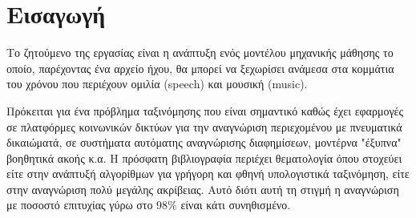 \section{Εισαγωγή}

Το ζητούμενο της εργασίας είναι η ανάπτυξη ενός μοντέλου μηχανικής
μάθησης το οποίο, παρέχοντας ένα αρχείο ήχου, θα μπορεί να ξεχωρίσει
ανάμεσα στα κομμάτια του χρόνου που περιέχουν ομιλία (speech) και
μουσική (music).

Πρόκειται για ένα πρόβλημα ταξινόμησης που είναι σημαντικό καθώς έχει
εφαρμογές σε πλατφόρμες κοινωνικών δικτύων για την αναγνώριση
περιεχομένου με πνευματικά δικαιώματά, σε συστήματα αυτόματης
αναγνώρισης διαφημίσεων, μοντέρνα "έξυπνα" βοηθητικά ακοής κ.α. Η
πρόσφατη βιβλιογραφία περιέχει θεματολογία όπου στοχεύει είτε στην
ανάπτυξή αλγορίθμων για γρήγορη και φθηνή υπολογιστικά ταξινόμηση,
είτε στην αναγνώριση πολύ μεγάλης ακρίβειας. Αυτό διότι αυτή τη
στιγμή η αναγνώριση με ποσοστό επιτυχίας γύρω στο 98\% είναι κάτι
συνηθισμένο.



